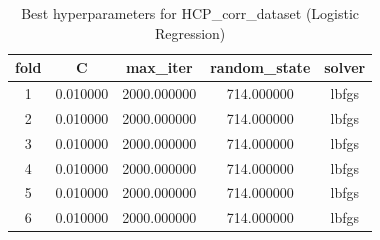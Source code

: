 \begin{table}[htbp]
\caption{Best hyperparameters for HCP_corr_dataset (Logistic Regression)}
\label{tab:best_hyperparams_HCP_corr_dataset}
\begin{tabular}{ccccc}
\toprule
fold & C & max_iter & random_state & solver \\
\midrule
1 & 0.010000 & 2000.000000 & 714.000000 & lbfgs \\
2 & 0.010000 & 2000.000000 & 714.000000 & lbfgs \\
3 & 0.010000 & 2000.000000 & 714.000000 & lbfgs \\
4 & 0.010000 & 2000.000000 & 714.000000 & lbfgs \\
5 & 0.010000 & 2000.000000 & 714.000000 & lbfgs \\
6 & 0.010000 & 2000.000000 & 714.000000 & lbfgs \\
\bottomrule
\end{tabular}
\end{table}
